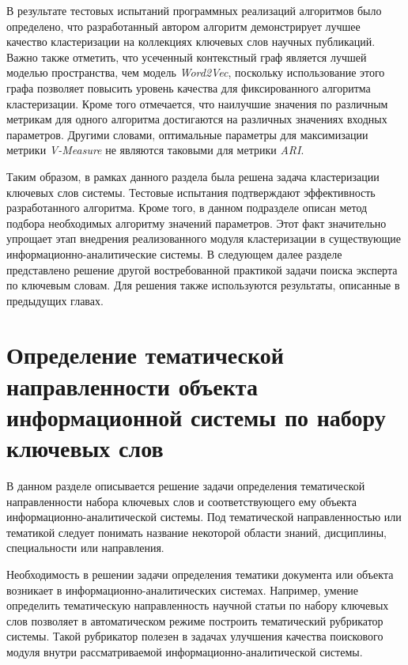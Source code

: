 В результате тестовых испытаний программных реализаций алгоритмов было определено, что разработанный автором алгоритм демонстрирует лучшее качество кластеризации на коллекциях ключевых слов научных публикаций. Важно также отметить, что усеченный контекстный граф является лучшей моделью пространства, чем модель \emph{Word2Vec}, поскольку использование этого графа позволяет повысить уровень качества для фиксированного алгоритма кластеризации. Кроме того отмечается, что наилучшие значения по различным метрикам для одного алгоритма достигаются на различных значениях входных параметров. Другими словами, оптимальные параметры для максимизации метрики \emph{V-Measure} не являются таковыми для метрики \emph{ARI}.

Таким образом, в рамках данного раздела была решена задача кластеризации ключевых слов системы. Тестовые испытания подтверждают эффективность разработанного алгоритма. Кроме того, в данном подразделе описан метод подбора необходимых алгоритму значений параметров. Этот факт значительно упрощает этап внедрения реализованного модуля кластеризации в существующие информационно-аналитические системы. В следующем далее разделе представлено решение другой востребованной практикой задачи поиска эксперта по ключевым словам. Для решения также используются результаты, описанные в предыдущих главах.

\section{Определение тематической направленности объекта информационной системы по набору ключевых слов} \label{theme_tags}

В данном разделе описывается решение задачи определения тематической направленности набора ключевых слов и соответствующего ему объекта информационно-аналитической системы. Под тематической направленностью или тематикой следует понимать название некоторой области знаний, дисциплины, специальности или направления. 

Необходимость в решении задачи определения тематики документа или объекта возникает в информационно-аналитических системах. Например, умение определить тематическую направленность научной статьи по набору ключевых слов позволяет в автоматическом режиме построить тематический рубрикатор системы. Такой рубрикатор полезен в задачах улучшения качества поискового модуля внутри рассматриваемой информационно-аналитической системы.



